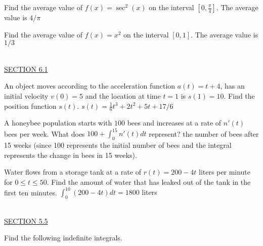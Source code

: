 \documentclass{exam}
\begin{document}
\begin{questions}
\question Find the average value of $f(x)=\sec^2(x)$ on the interval $\left[ 0, \frac{\pi}{4} \right]$.  
 {\color{red}  The average value is $4/\pi$}

\question Find the average value of $f(x) = x^2$ on the interval $[0,1]$.  {\color{red} The average value is $1/3$}

    \newpage\thispagestyle{empty}
\ \\  
  \underline{SECTION 6.1}

\question An object moves according to the acceleration function $a(t)=t+4$, has an initial velocity $v(0)=5$ and the location at time $t=1$ is $s(1)=10$.  Find the position function $s(t)$. 
 {\color{red} $s(t)=\frac{1}{6}t^3+2t^2+5t+17/6$}

\question A honeybee population starts with $100$ bees and increases at a rate of $n'(t)$ bees per week.  What does $100+\displaystyle\int_0^{15}n'(t)dt$ represent? 
 {\color{red} the number of bees after 15 weeks (since 100 represents the initial number of bees and the integral represents the change in bees in 15 weeks).}

\question Water flows from a storage tank at a rate of $r(t)=200-4t$ liters per minute for $0\leq t\leq 50$.  Find the amount of water that has leaked out of the tank in the first ten minutes. {\color{red} $\displaystyle\int_0^{10} (200-4t)dt=1800$ liters}

\ \\
\underline{SECTION 5.5}

\question Find the following indefinite integrals.
  \begin{parts}
\end{parts}
\end{questions}
\end{document}

